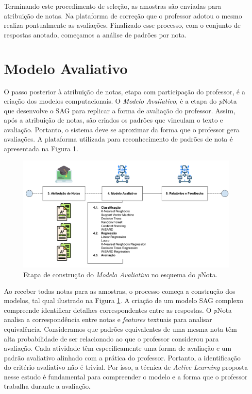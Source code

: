 Terminando este procedimento de seleção, as amostras são enviadas para atribuição de notas. Na plataforma de correção que o professor adotou o mesmo realiza pontualmente as avaliações. Finalizado esse processo, com o conjunto de respostas anotado, começamos a análise de padrões por nota.


\section{Modelo Avaliativo}
\label{sec-avaliacao}

O passo posterior à atribuição de notas, etapa com participação do professor, é a criação dos modelos computacionais. O \textit{Modelo Avaliativo}, é a etapa do \textit{p}Nota que desenvolve o SAG para replicar a forma de avaliação do professor. Assim, após a atribuição de notas, são criados os padrões que vinculam o texto e avaliação.  Portanto, o sistema deve se aproximar da forma que o professor gera avaliações. A plataforma utilizada para reconhecimento de padrões de nota é apresentada na Figura \ref{fig-ma}.

\begin{figure}[!h]
\centering
\includegraphics[width=\textwidth]{figuras/esquema-ma-pNota.png}
\caption{Etapa de construção do \textit{Modelo Avaliativo} no esquema do \textit{p}Nota.}
\label{fig-ma}
\end{figure}

Ao receber todas notas para as amostras, o processo começa a construção dos modelos, tal qual ilustrado na Figura \ref{fig-ma}. A criação de um modelo SAG complexo compreende identificar detalhes correspondentes entre as respostas. O \textit{p}Nota analisa a correspondência entre notas e \textit{features} textuais para analisar equivalência. Consideramos que padrões equivalentes de uma mesma nota têm alta probabilidade de ser relacionado ao que o professor considerou para avaliação. Cada atividade têm especificamente uma forma de avaliação e um padrão avaliativo alinhado com a prática do professor. Portanto, a identificação do critério avaliativo não é trivial. Por isso, a técnica de \textit{Active Learning} proposta nesse estudo é fundamental para compreender o modelo e a forma que o professor trabalha durante a avaliação.


